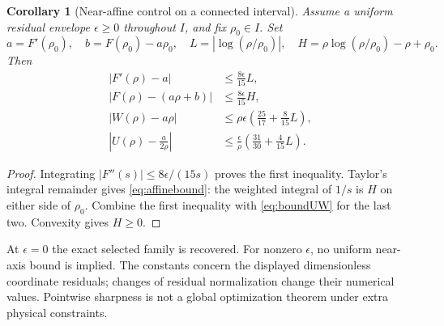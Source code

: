 \documentclass[11pt]{article}
\newtheorem{corollary}[theorem]{Corollary}
\begin{document}
\begin{corollary}[Near-affine control on a connected interval]
Assume a uniform residual envelope $\epsilon\ge0$ throughout $I$, and fix $\rho_0\in I$. Set
\[
a=F'(\rho_0),\quad b=F(\rho_0)-a\rho_0,\quad
L=|\log(\rho/\rho_0)|,\quad
H=\rho\log(\rho/\rho_0)-\rho+\rho_0.
\]
Then
\begin{align}
|F'(\rho)-a|&\le\frac{8\epsilon}{15}L,\\
|F(\rho)-(a\rho+b)|&\le\frac{8\epsilon}{15}H,\label{eq:affinebound}\\
|W(\rho)-a\rho|&\le\rho\epsilon\left(\frac{25}{17}+\frac8{15}L\right),\\
\left|U(\rho)-\frac a{2\rho}\right|&\le\frac\epsilon\rho\left(\frac{31}{30}+\frac4{15}L\right).
\end{align}
\end{corollary}
\begin{proof}
Integrating $|F''(s)|\le8\epsilon/(15s)$ proves the first inequality. Taylor's integral remainder gives \eqref{eq:affinebound}: the weighted integral of $1/s$ is $H$ on either side of $\rho_0$. Combine the first inequality with \eqref{eq:boundUW} for the last two. Convexity gives $H\ge0$.
\end{proof}
At $\epsilon=0$ the exact selected family is recovered. For nonzero $\epsilon$, no uniform near-axis bound is implied. The constants concern the displayed dimensionless coordinate residuals; changes of residual normalization change their numerical values. Pointwise sharpness is not a global optimization theorem under extra physical constraints.
\end{document}
